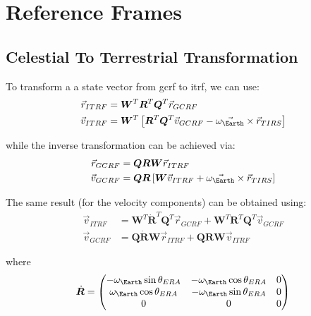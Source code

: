 \section{Reference Frames}

\subsection{Celestial To Terrestrial Transformation}
\label{sec:itrs-to-gcrs}

To transform a a state vector from \gls{gcrf} to \gls{itrf}, we can use: 
\begin{align}\label{eq:vallado2201}
  \vec{r}_{ITRF} &= \bm{W}^T \bm{R}^T \bm{Q}^T \vec{r}_{GCRF} \\
  \vec{v}_{ITRF} &= \bm{W}^T \left[ \bm{R}^T \bm{Q}^T \vec{v}_{GCRF} - \vec{\omega _{\Earth}} \times \vec{r}_{TIRS} \right]
\end{align}

while the inverse transformation can be achieved via:
\begin{align}\label{eq:vallado2202}
  \vec{r}_{GCRF} &= \bm{Q} \bm{R} \bm{W} \vec{r}_{ITRF} \\
  \vec{v}_{GCRF} &= \bm{Q} \bm{R} \left[ \bm{W} \vec{v}_{ITRF} + \vec{\omega _{\Earth}} \times \vec{r}_{TIRS} \right]
\end{align}

The same result (for the velocity components) can be obtained using:
\begin{align}
  \vec{v}_{ITRF} &= \bm{W}^T \dot{\bm{R}}^T \bm{Q}^T \vec{r}_{GCRF} + \bm{W}^T \bm{R}^T \bm{Q}^T \vec{v}_{GCRF} \\
  \vec{v}_{GCRF} &= \bm{Q} \dot{\bm{R}} \bm{W} \vec{r}_{ITRF} + \bm{Q} \bm{R} \bm{W} \vec{v}_{ITRF}
\end{align}

where 
\begin{equation}\label{eq:vallado2221}
\dot{\bm{R}} = \begin{pmatrix} -\omega_{\Earth} \sin \theta _{ERA} & -\omega_{\Earth} \cos \theta _{ERA} & 0 \\
  \omega_{\Earth} \cos \theta _{ERA} & -\omega_{\Earth} \sin \theta _{ERA} & 0 \\
  0 & 0 & 0 \end{pmatrix}
\end{equation}


